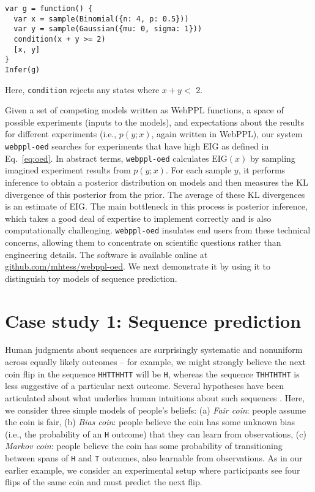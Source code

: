 \documentclass[10pt,letterpaper]{article}
\newcommand{\ndg}[1]{\textcolor{Green}{[ndg: #1]}}
\begin{document}
\begin{lstlisting}[mathescape, label={code:forward-model-complex}]
var g = function() {
  var x = sample(Binomial({n: 4, p: 0.5}))
  var y = sample(Gaussian({mu: 0, sigma: 1}))
  condition(x + y >= 2)
  [x, y]
}
Infer(g)
\end{lstlisting}
Here, \texttt{condition} rejects any states where $x + y <$ 2.

Given a set of competing models written as WebPPL functions, a space of possible experiments (inputs to the models), and expectations about the results for different experiments (i.e., $p(y; x)$, again written in WebPPL), our system \texttt{webppl-oed} searches for experiments that have high EIG as defined in Eq.~\ref{eq:oed}.
In abstract terms, \texttt{webppl-oed} calculates $\mathrm{EIG}(x)$ by sampling imagined experiment results from $p(y; x)$.
For each sample $y$, it performs inference to obtain a posterior distribution on models and then measures the KL divergence of this posterior from the prior.
The average of these KL divergences is an estimate of EIG.
The main bottleneck in this process is posterior inference, which takes a good deal of expertise to implement correctly and is also computationally challenging.
\texttt{webppl-oed} insulates end users from these technical concerns, allowing them to concentrate on scientific questions rather than engineering details.
The software is available online at \break\url{github.com/mhtess/webppl-oed}.
We next demonstrate it by using it to distinguish toy models of sequence prediction.

\section{Case study 1: Sequence prediction}
\label{s:tutorial}

Human judgments about sequences are surprisingly systematic and nonuniform across equally likely outcomes -- for example, we might strongly believe the next coin flip in the sequence \lstinline{HHTTHHTT} will be \lstinline{H}, whereas the sequence \lstinline{THHTHTHT} is less suggestive of a particular next outcome.
Several hypotheses have been articulated about what underlies human intuitions about such sequences \citep{goodfellow38:jep, falk81:pme, Griffiths2004_nips}.
Here, we consider three simple models of people's beliefs: (a) \emph{Fair coin}: people assume the coin is fair, (b) \emph{Bias coin}: people believe the coin has some unknown bias (i.e., the probability of an \lstinline{H} outcome) that they can learn from observations, (c) \emph{Markov coin}: people believe the coin has some probability of transitioning between spans of \lstinline{H} and \lstinline{T} outcomes, also learnable from observations.
As in our earlier example, we consider an experimental setup where participants see four flips of the same coin and must predict the next flip.
\end{document}
